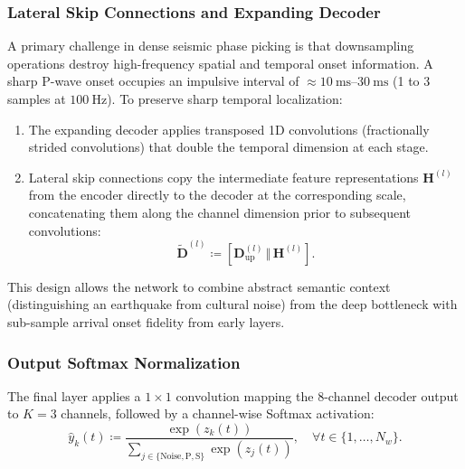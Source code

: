 \subsubsection{Lateral Skip Connections and Expanding Decoder}
A primary challenge in dense seismic phase picking is that
downsampling operations destroy high-frequency spatial and temporal
onset information. A sharp P-wave onset occupies an impulsive
interval of $\approx \qtyrange{10}{30}{\milli\second}$ (1 to 3 samples at
$\qty{100}{\hertz}$). To preserve sharp temporal localization:
\begin{enumerate}
  \item The expanding decoder applies transposed 1D convolutions
    (fractionally strided convolutions) that double the temporal
    dimension at each stage.
  \item Lateral skip connections copy the intermediate feature
    representations $\mathbf{H}^{(l)}$ from the encoder directly to
    the decoder at the corresponding scale, concatenating them along
    the channel dimension prior to subsequent convolutions:
    \begin{equation}
      \tilde{\mathbf{D}}^{(l)} \coloneqq \left[
      \mathbf{D}_{\mathrm{up}}^{(l)} \, \Big\Vert \, \mathbf{H}^{(l)} \right].
    \end{equation}
\end{enumerate}

This design allows the network to combine abstract semantic context
(distinguishing an earthquake from cultural noise) from the deep
bottleneck with sub-sample arrival onset fidelity from early layers.

\subsubsection{Output Softmax Normalization}
The final layer applies a $1 \times 1$ convolution mapping the
8-channel decoder output to $K = 3$ channels, followed by a
channel-wise Softmax activation:
\begin{equation}
  \hat{y}_k(t) \coloneqq \frac{\exp\left(z_k(t)\right)}{\sum_{j \in
    \{\mathrm{Noise}, \mathrm{P}, \mathrm{S}\}}
  \exp\left(z_j(t)\right)}, \quad \forall t \in \{1, \dots, N_w\}.
  \label{eq:pipeline_phasenet_softmax}
\end{equation}

